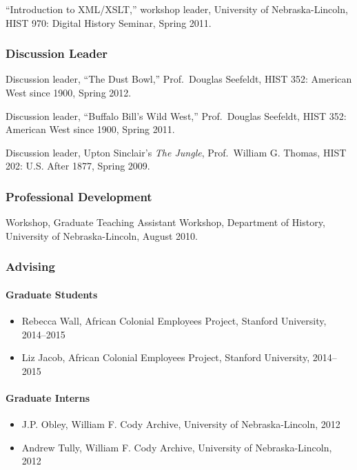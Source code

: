 ``Introduction to XML/XSLT,'' workshop leader, University of
Nebraska-Lincoln, HIST 970: Digital History Seminar, Spring 2011.

\subsubsection{Discussion Leader}\label{discussion-leader}

Discussion leader, ``The Dust Bowl,'' Prof.~Douglas Seefeldt, HIST 352:
American West since 1900, Spring 2012.

Discussion leader, ``Buffalo Bill's Wild West,'' Prof.~Douglas Seefeldt,
HIST 352: American West since 1900, Spring 2011.

Discussion leader, Upton Sinclair's \emph{The Jungle}, Prof.~William G.
Thomas, HIST 202: U.S. After 1877, Spring 2009.

\subsubsection{Professional
Development}\label{professional-development-1}

Workshop, Graduate Teaching Assistant Workshop, Department of History,
University of Nebraska-Lincoln, August 2010.

\subsubsection{Advising}\label{advising}

\paragraph{Graduate Students}\label{graduate-students}

\begin{itemize}
\tightlist
\item
  Rebecca Wall, African Colonial Employees Project, Stanford University,
  2014--2015
\item
  Liz Jacob, African Colonial Employees Project, Stanford University,
  2014--2015
\end{itemize}

\paragraph{Graduate Interns}\label{graduate-interns}

\begin{itemize}
\tightlist
\item
  J.P. Obley, William F. Cody Archive, University of Nebraska-Lincoln,
  2012
\item
  Andrew Tully, William F. Cody Archive, University of Nebraska-Lincoln,
  2012
\end{itemize}

